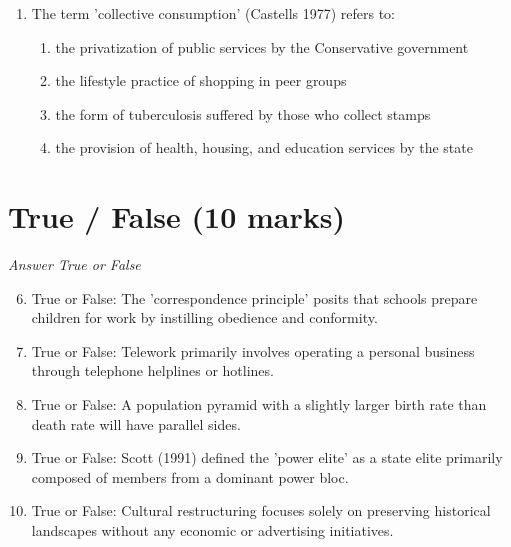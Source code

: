 \documentclass[12pt]{article}
\begin{document}
\begin{enumerate}[label=\arabic*.]
\begin{enumerate}[label=(\alph*)]
    \item race is an objective way of categorizing people on biological grounds
    \item the idea of race is socially constructed through powerful ideologies
    \item race relations in Britain and America can be traced back to colonial times
    \item people choose their racial identity and this becomes fixed
\end{enumerate}
\item The term 'collective consumption' (Castells 1977) refers to:
\begin{enumerate}[label=(\alph*)]
    \item the privatization of public services by the Conservative government
    \item the lifestyle practice of shopping in peer groups
    \item the form of tuberculosis suffered by those who collect stamps
    \item the provision of health, housing, and education services by the state
\end{enumerate}
\end{enumerate}

\section*{True / False (10 marks)}
\textit{Answer True or False}
\begin{enumerate}[label=\arabic*.]
\setcounter{enumi}{5}
\item True or False: The 'correspondence principle' posits that schools prepare children for work by instilling obedience and conformity.
\item True or False: Telework primarily involves operating a personal business through telephone helplines or hotlines.
\item True or False: A population pyramid with a slightly larger birth rate than death rate will have parallel sides.
\item True or False: Scott (1991) defined the 'power elite' as a state elite primarily composed of members from a dominant power bloc.
\item True or False: Cultural restructuring focuses solely on preserving historical landscapes without any economic or advertising initiatives.
\end{enumerate}
\end{document}
